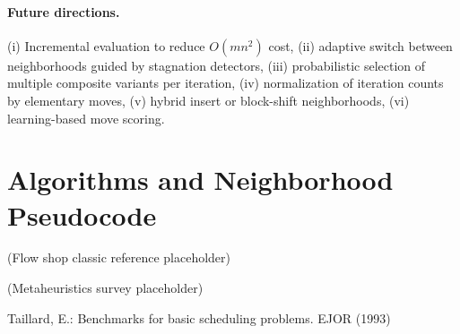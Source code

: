 \documentclass[runningheads]{llncs}
\begin{document}
\paragraph{Future directions.}
(i) Incremental evaluation to reduce $O(m n^2)$ cost, (ii) adaptive switch between neighborhoods guided by stagnation detectors, (iii) probabilistic selection of multiple composite variants per iteration, (iv) normalization of iteration counts by elementary moves, (v) hybrid insert or block-shift neighborhoods, (vi) learning-based move scoring.

\section{Algorithms and Neighborhood Pseudocode}


\begin{thebibliography}{8}
(Flow shop classic reference placeholder)

(Metaheuristics survey placeholder)

Taillard, E.: Benchmarks for basic scheduling problems. EJOR (1993)

\end{thebibliography}
\end{document}
